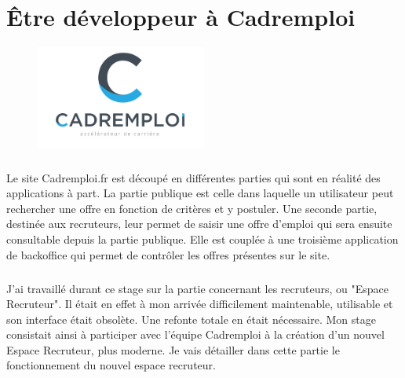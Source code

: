 
\chapter{Être développeur à Cadremploi} %

\label{apports} %


\begin{figure}[h]
  \begin{center}
    \hspace*{-1in}
    \includegraphics[width=0.5\textwidth]{Pictures/CE_logo.png}
  \end{center}
\end{figure}
\paragraph{}
Le site Cadremploi.fr est découpé en différentes parties qui sont en réalité des applications à part.
La partie publique est celle dans laquelle un utilisateur peut rechercher une offre en fonction de critères et y postuler.
Une seconde partie, destinée aux recruteurs, leur permet de saisir une offre d'emploi qui sera ensuite consultable depuis la partie publique.
Elle est couplée à une troisième application de backoffice qui permet de contrôler les offres présentes sur le site.
\paragraph{}
J'ai travaillé durant ce stage sur la partie concernant les recruteurs, ou "Espace Recruteur".
Il était en effet à mon arrivée difficilement maintenable, utilisable et son interface était obsolète.
Une refonte totale en était nécessaire.
Mon stage consistait ainsi à participer avec l'équipe Cadremploi à la création d'un nouvel Espace Recruteur, plus moderne.
Je vais détailler dans cette partie le fonctionnement du nouvel espace recruteur.








